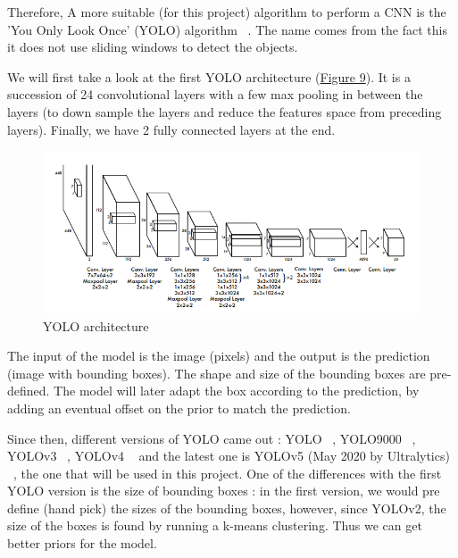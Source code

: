\documentclass{article}
\begin{document}
\bigskip

Therefore, A more suitable (for this project) algorithm to perform a CNN is the 'You Only Look Once' (YOLO) algorithm ~\cite{redmon2016you}. The name comes from the fact this it does not use sliding windows to detect the objects.

\bigskip

We will first take a look at the first YOLO architecture (\hyperref[Figure 9]{Figure 9}). It is a succession of 24 convolutional layers with a few max pooling in between the layers (to down sample the layers and reduce the features space from preceding layers). Finally, we have 2 fully connected layers at the end.

\begin{figure}[!ht]
  \centering
  \includegraphics[scale = 0.95]{YOLOv5/yoloarchitecture.PNG}
  \caption{YOLO architecture ~\cite{redmon2016you}}
  \label{Figure 9}
\end{figure}

The input of the model is the image (pixels) and the output is the prediction (image with bounding boxes). The shape and size of the bounding boxes are pre-defined. The model will later adapt the box according to the prediction, by adding an eventual offset on the prior to match the prediction.

\bigskip

Since then, different versions of YOLO came out : YOLO ~\cite{redmon2016you}, YOLO9000 ~\cite{redmon2017yolo9000}, YOLOv3 ~\cite{redmon2018yolov3}, YOLOv4 ~\cite{bochkovskiy2020yolov4} and the latest one is YOLOv5 (May 2020 by Ultralytics) ~\cite{yolov5}, the one that will be used in this project. One of the differences with the first YOLO version is the size of bounding boxes : in the first version, we would pre define (hand pick) the sizes of the bounding boxes, however, since YOLOv2, the size of the boxes is found by running a k-means clustering. Thus we can get better priors for the model. 
\end{document}
